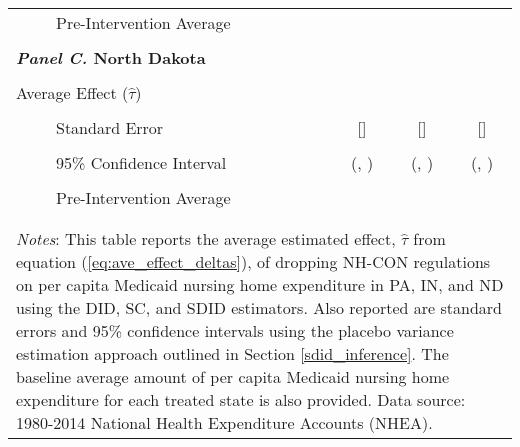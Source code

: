 \documentclass[../Main.tex]{subfiles}
\begin{document}
\begin{table}[htbp]
\begin{tabular}{l*{3}{c}}
\\[-2ex]
\multicolumn{1}{l}{\ \ \ \ \ Pre-Intervention Average}&   \multicolumn{3}{c}{}\\
\\[-.1ex]
\multicolumn{4}{l}{\textbf{\textit{Panel C.} North Dakota}}\\
\\[-1.5ex]
\multicolumn{1}{l}{Average Effect ($\hat{\tau}$)}&   \multicolumn{1}{c}{}&   \multicolumn{1}{c}{}&  \multicolumn{1}{c}{}\\
\\[-2ex]
\multicolumn{1}{l}{\ \ \ \ \ Standard Error}  &\multicolumn{1}{c}{[]}&\multicolumn{1}{c}{[]}&\multicolumn{1}{c}{[]}\\
\\[-2ex]
\multicolumn{1}{l}{\ \ \ \ \ 95\% Confidence Interval}&   \multicolumn{1}{c}{(, )}&   \multicolumn{1}{c}{(, )}&   \multicolumn{1}{c}{(, )}\\
\\[-2ex]
\multicolumn{1}{l}{\ \ \ \ \ Pre-Intervention Average}&   \multicolumn{3}{c}{}\\
\\[-.1ex]
\hline\hline
\\[-2ex]
\multicolumn{4}{p{.69\linewidth}}{\footnotesize \textit{Notes}: This table reports the average estimated effect, $\hat{\tau}$ from equation (\ref{eq:ave_effect_deltas}), of dropping NH-CON regulations on per capita Medicaid nursing home expenditure in PA, IN, and ND using the DID, SC, and SDID estimators. Also reported are standard errors and 95\% confidence intervals using the placebo variance estimation approach outlined in Section \ref{sdid_inference}. The baseline average amount of per capita Medicaid nursing home expenditure for each treated state is also provided. Data source: 1980-2014 National Health Expenditure Accounts (NHEA).}
\end{tabular}
\end{table}
\vfill
\clearpage
\end{document}
